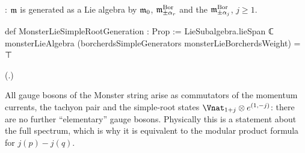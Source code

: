 \begin{definition}\label{ch18:def:hgen}
: $\mathfrak{m}$ is generated as a Lie algebra by $\mathfrak{m}_0$, $\mathfrak{m}^{\mathrm{Bor}}_{\pm\alpha_r}$ and the
$\mathfrak{m}^{\mathrm{Bor}}_{\pm\alpha_j}$, $j\ge1$.
\end{definition}
\begin{leancode}
def MonsterLieSimpleRootGeneration : Prop :=
  LieSubalgebra.lieSpan ℂ monsterLieAlgebra (borcherdsSimpleGenerators monsterLieBorcherdsWeight) =
    ⊤
\end{leancode}
(.)
\begin{physics}
All gauge bosons of the Monster string arise as commutators of the momentum currents, the tachyon pair and the simple-root
states $\Vnat_{1+j}\otimes e^{(1,-j)}$: there are no further ``elementary'' gauge bosons.  Physically this is a statement about
the full spectrum, which is why it is equivalent to the modular product formula for $j(p)-j(q)$.
\end{physics}

